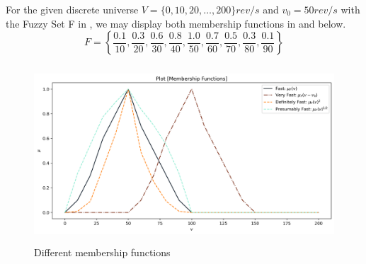 \documentclass{tron}
\begin{document}
For the given discrete universe $V=\{0,10,20,\dots,200\} \unit{rev/s}$ and $v_0 = 50 \unit{rev/s}$ with the Fuzzy Set F in , we may display both membership functions in  and  below.
\begin{equation}
		F = \left\{ \frac{0.1}{10}, \frac{0.3}{20}, \frac{0.6}{30}, \frac{0.8}{40}, \frac{1.0}{50}, \frac{0.7}{60}, \frac{0.5}{70}, \frac{0.3}{80}, \frac{0.1}{90}\right\}	 \label{eqn:p3:F}
\end{equation}

\begin{figure}[H]
	\centering
	\includegraphics[height=250px]{../src_code/output/P3/plot_Membership Functions}
	\caption{Different membership functions}
	\label{fig:p3:result}
\end{figure}
\end{document}
